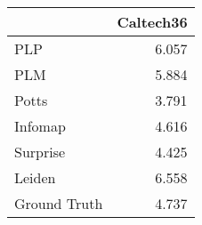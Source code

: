 \begin{tabular}{lr}
\toprule
{} & Caltech36 \\
\midrule
PLP          &     6.057 \\
PLM          &     5.884 \\
Potts        &     3.791 \\
Infomap      &     4.616 \\
Surprise     &     4.425 \\
Leiden       &     6.558 \\
Ground Truth &     4.737 \\
\bottomrule
\end{tabular}
